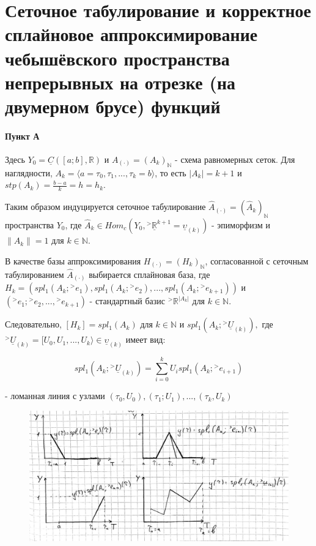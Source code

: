 \documentclass[__main__.tex]{subfiles}
\begin{document}
\section{Сеточное табулирование и корректное сплайновое аппроксимирование чебышёвского пространства непрерывных на отрезке (на двумерном брусе) функций}

\paragraph{Пункт А}

Здесь $Y_0 = \underline{C} \left([a;b],\mathbb{R}\right)$ и $A_{\left(\cdot\right)} = \left(A_k\right)_{\mathbb{N}}$ - схема равномерных сеток. Для наглядности, $A_k = \langle a=\tau_0, \tau_1,...,\tau_k=b \rangle$, то есть $\left|A_k\right|=k+1$ и $stp\left(A_k\right)=\frac{b-a}{k}=h=h_k$.

Таким образом индуцируется сеточное табулирование $\hat{A}_{\left(\cdot\right)}=\left(\hat{A}_k\right)_{\mathbb{N}}$ пространства $Y_0$, где $\hat{A}_k \in Hom_c\left(Y_0,{}^>\underline{\mathbb{R}}^{k+1}=\underline{\upsilon}_{\left(k\right)}\right)$ - эпиморфизм и $\| \hat{A}_k \| = 1$ для $k \in \mathbb{N}$.

В качестве базы аппроксимирования $H_{\left(\cdot\right)} = \left(H_k\right)_{\mathbb{N}}$, согласованной с сеточным табулированием $\hat{A}_{\left(\cdot\right)}$ выбирается сплайновая база, где $H_k = \left(spl_1 \left(A_k; {}^> e_1\right),spl_1 \left(A_k; {}^> e_2\right),...,spl_1\left(A_k;{}^> e_{k+1}\right)\right)$ и $\left({}^> e_1; {}^>e_2,...,{}^>e_{k+1}\right)$ - стандартный базис ${}^>\mathbb{R}^{\left|A_k\right|}$ для $k\in \mathbb{N}$.

Следовательно, $[H_k] = spl_1 \left(A_k\right)$ для $k \in \mathbb{N}$ и $spl_1 \left(A_k; {}^> \underline{U}_{\left(k\right)}\right),$ где ${}^> \underline{U}_{\left(k\right)} = [ U_0,U_1,...,U_k \rangle \in \underline{\upsilon}_{\left(k\right)}$ имеет вид:

\begin{equation}
spl_1\left(A_k; {}^>\underline{U}_{\left(k\right)}\right) = \sum_{i=0}^{k} U_i spl_1 \left(A_k;{}^> e_{i+1}\right)
\end{equation}

- ломанная линия с узлами $\left(\tau_0,U_0\right), \left(\tau_1;U_1\right),...,\left(\tau_k, U_k\right)$

\begin{figure}[h!]
	\centering
	\includegraphics[width=0.7\linewidth]{img/img_9-1}
	\caption{}
	\label{img9-1}
\end{figure}
\end{document}
